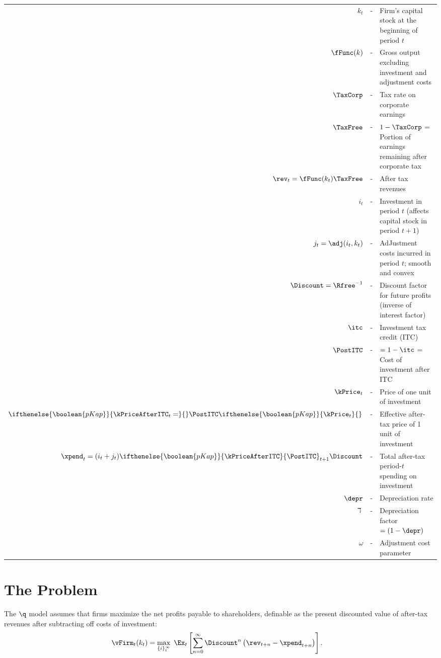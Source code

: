 \documentclass[headings=optiontotocandhead,toc=flat]{handout}
\newcommand{\pkTF}{\ifthenelse{\boolean{pKap}}}
\begin{document}
\begin{tabular}{rcl}
  $k_{t}$      & - & Firm's capital stock at the beginning of period $t$
  \\ $\fFunc(k)$      & - & Gross output excluding investment and adjustment costs
  \\ $\TaxCorp $ & - & Tax rate on corporate earnings
  \\ $\TaxFree$  & - & $1-\TaxCorp$ = Portion of earnings remaining after corporate tax
  \\ $\rev_{t} = \fFunc(k_{t})\TaxFree   $ & - & After tax revenues
  \\ $i_{t}     $ & - & Investment in period $t$ (affects capital stock in period $t+1$)
  \\ $j_{t} = \adj(i_{t},k_{t})     $ & - & AdJustment costs incurred in period $t$; smooth and convex
  \\ $\Discount=\Rfree^{-1} $ & - & Discount factor for future profits (inverse of interest factor)
  \\ $\itc$    & - & Investment tax credit (ITC)
  \\ $\PostITC$    & - & $=1-\itc$ = Cost of investment after ITC
                         \pkTF{\\ $\kPrice_{t}$   & - & Price of one unit of investment}{}
                                                        \pkTF{\\ $\pkTF{\kPriceAfterITC_{t}=}{}\PostITC \pkTF{\kPrice_{t}}{}$ & - & Effective after-tax price of 1 unit of investment}{} \\ $\xpend_{t} = (i_{t}+j_{t})\pkTF{\kPriceAfterITC}{\PostITC}_{t+1}\Discount $  & - & Total after-tax period-$t$ spending on investment
  \\ $\depr$ & - & Depreciation rate
  \\ $\daleth$ & - & Depreciation factor $=(1-\depr)$
  \\ $\omega$ & - & Adjustment cost parameter
\end{tabular}

\medskip

\section[hypertarget={The-Problem}]{The Problem}

The $\q$ model assumes that firms maximize the net profits payable to shareholders, definable as the present discounted value of after-tax revenues after subtracting off costs of investment:
\begin{equation}\begin{gathered}\begin{aligned}
      \vFirm_{t}(k_{t}) & =  \max_{\{i\}_{t}^{\infty}}~\Ex_{t}\left[\sum_{n=0}^{\infty} \Discount^{n} \left(\rev_{t+n}-\xpend_{t+n}\right)\right].
    \end{aligned}\end{gathered}\end{equation}
\end{document}

